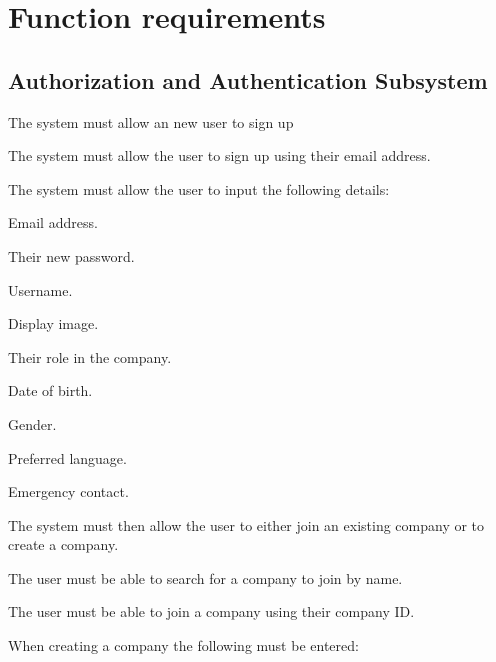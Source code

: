 \documentclass{article}
\begin{document}
	
	\newpage
	

	
	\section*{Function requirements}
	\subsection*{Authorization and Authentication Subsystem}	
	\begin{list}{R.}{}
		\item The system must allow an new user to sign up
		\begin{list}{R.}{}
			\item The system must allow the user to sign up using their email address.
			\item The system must allow the user to input the following details:
			\begin{list}{R..}{}
				\item Email address.
				\item Their new password. 
				\item Username.
				\item Display image.
				\item Their role in the company.
				\item Date of birth.
				\item Gender.
				\item Preferred language.
				\item Emergency contact. 
			\end{list} 
			\item The system must then allow the user to either join an existing company or to create a company.
			\begin{list}{R..}{}
				\item The user must be able to search for a company to join by name.
				\item The user must be able to join a company using their company ID.
			\end{list} 
			\item When creating a company the following must be entered:
			\begin{list}{R..}{}

\end{list}
\end{list}
\end{list}
\end{document}

